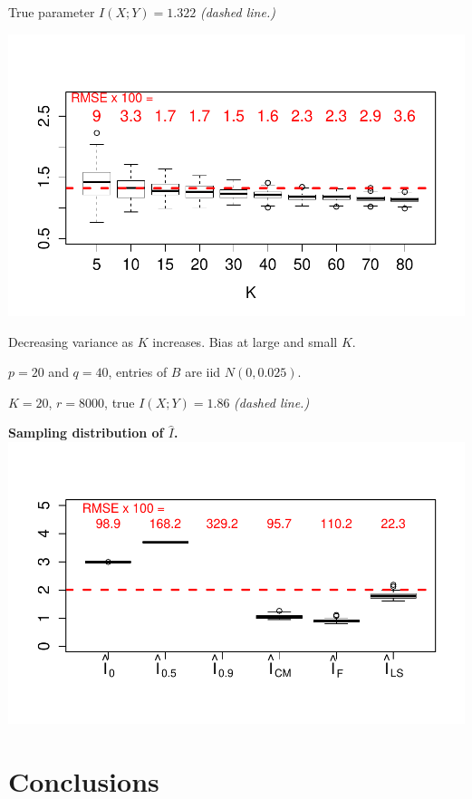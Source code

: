 \documentclass[12pt]{article}
\begin{document}
True parameter $I(X; Y) = 1.322$ \emph{(dashed line.)}
\begin{center}
\includegraphics[scale = 0.6, clip = true, trim = 0 0.5in 0 0.5in]{../info_theory_sims/fig5a.pdf}
\end{center}

Decreasing variance as $K$ increases. Bias at large and small $K$.

$p = 20$ and $q = 40$, entries of $B$ are iid $N(0, 0.025)$.

$K=20$, $r = 8000$, true $I(X; Y) = 1.86$ \emph{(dashed line.)}

\begin{center}
\textbf{Sampling distribution of $\hat{I}$.}
\includegraphics[scale = 0.6, clip = true, trim = 0 0.5in 0 0.5in]{../info_theory_sims/fig6.pdf}
\end{center}

\section{Conclusions}
\end{document}
